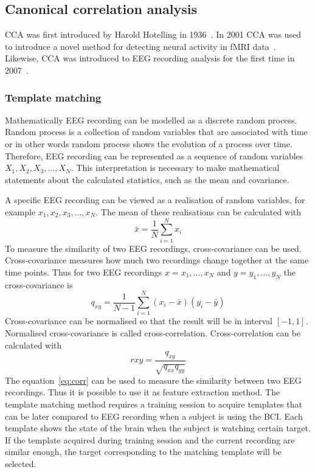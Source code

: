 \subsection{Canonical correlation analysis}

\Gls{CCA} was first introduced by Harold Hotelling in 1936~\cite{cca_hotelling}. In 2001 \gls{CCA} was used to introduce a novel method for detecting neural activity in \gls{fMRI} data~\cite{cca_fmri}. Likewise, \gls{CCA} was introduced to \gls{EEG} recording analysis for the first time in 2007~\cite{cca_lin}.

\subsubsection{Template matching}

Mathematically \gls{EEG} recording can be modelled as a discrete random process. Random process is a collection of random variables that are associated with time or in other words random process shows the evolution of a process over time. Therefore, \gls{EEG} recording can be represented as a sequence of random variables $X_1, X_2, X_3, \dots, X_N$. This interpretation is necessary to make mathematical statements about the calculated statistics, such as the mean and covariance.

A specific \gls{EEG} recording can be viewed as a realisation of random variables, for example $x_1, x_2, x_3, \dots, x_N$. The mean of these realisations can be calculated with
\begin{equation}
	\bar{x} = \frac{1}{N}\sum_{i=1}^{N}x_i
\end{equation}
To measure the similarity of two \gls{EEG} recordings, cross-covariance can be used. Cross-covariance measures how much two recordings change together at the same time points. Thus for two \gls{EEG} recordings $x=x_1,\dots,x_N$ and $y=y_1, \dots, y_N$ the cross-covariance is
\begin{equation}
	q_{xy} = \frac{1}{N-1}\sum_{i=1}^{N}(x_i-\bar{x})(y_i-\bar{y})
\end{equation}
Cross-covariance can be normalised so that the result will be in interval $[-1, 1]$. Normalised cross-covariance is called cross-correlation. Cross-correlation can be calculated with
\begin{equation}
	\label{eq:corr}
	r{xy} = \frac{q_{xy}}{\sqrt{q_{xx}q_{yy}}}
\end{equation}
The equation~\ref{eq:corr} can be used to measure the similarity between two \gls{EEG} recordings. Thus it is possible to use it as \gls{feature extraction} method. The template matching method requires a training session to acquire templates that can be later compared to \gls{EEG} recording when a subject is using the \gls{BCI}. Each template shows the state of the brain when the subject is watching certain \gls{target}. If the template acquired during training session and the current recording are similar enough, the target corresponding to the matching template will be selected.

